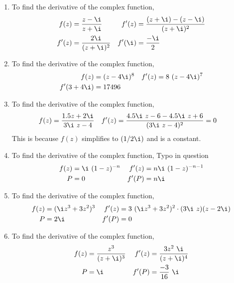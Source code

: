 \begin{enumerate}
    \item To find the derivative of the complex function,
          \begin{align}
              f(z)   & = \frac{z-\i}{z + \i}                   &
              f'(z)  & = \frac{(z + \i) - (z- \i)}{(z + \i)^2}   \\
              f'(z)  & = \frac{2\i}{(z + \i)^2}                &
              f'(\i) & = \frac{-\i}{2}
          \end{align}

    \item To find the derivative of the complex function,
          \begin{align}
              f(z)        & = (z - 4 \i)^8   &
              f'(z)       & = 8\ (z - 4\i)^7   \\
              f'(3 + 4\i) & = 17496
          \end{align}

    \item To find the derivative of the complex function,
          \begin{align}
              f(z)  & = \frac{1.5z + 2\i}{3\i\ z - 4}                          &
              f'(z) & = \frac{4.5\i\ z - 6 - 4.5\i\ z + 6}{(3\i\ z - 4)^2} = 0
          \end{align}
          This is because $ f(z) $ simplifies to $ (1/2\i) $ and is a constant.

    \item To find the derivative of the complex function,
          \textcolor{y_p}{Typo in question}
          \begin{align}
              f(z)  & = \i\ (1-z)^{-n}    &
              f'(z) & = n\i\ (1-z)^{-n-1}   \\
              P     & = 0                 &
              f'(P) & = n\i
          \end{align}

    \item To find the derivative of the complex function,
          \begin{align}
              f(z)  & = (\i z^3 + 3z^2)^3                             &
              f'(z) & = 3\ (\i z^3 + 3z^2)^2 \cdot (3\i\ z) (z - 2\i)   \\
              P     & = 2\i                                           &
              f'(P) & = 0
          \end{align}

    \item To find the derivative of the complex function,
          \begin{align}
              f(z)  & = \frac{z^3}{(z + \i)^3}      &
              f'(z) & = \frac{3z^2\ \i}{(z + \i)^4}   \\
              P     & = \i                          &
              f'(P) & = \frac{-3}{16}\ \i
          \end{align}


\end{enumerate}
